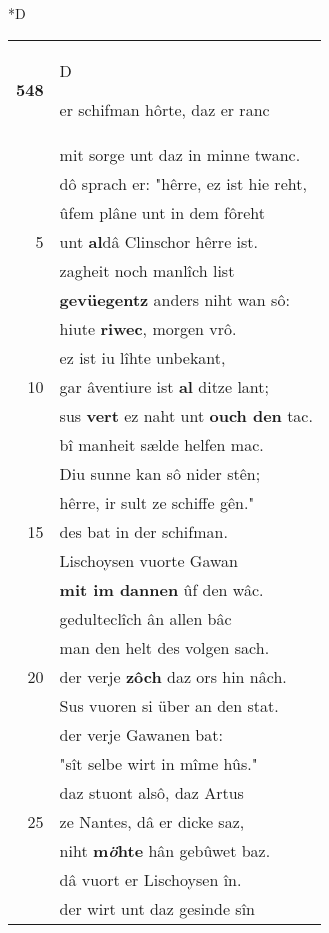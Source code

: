 \documentclass[8pt,a4paper,notitlepage]{article}
\begin{document}
\begin{table}[ht]
\begin{minipage}[t]{0.5\linewidth}
\small
\begin{center}*D
\end{center}
\begin{tabular}{rl}
\textbf{548} & \begin{large}D\end{large}er schifman hôrte, daz er ranc\\ 
 & mit sorge unt daz in minne twanc.\\ 
 & dô sprach er: "hêrre, ez ist hie reht,\\ 
 & ûfem plâne unt in dem fôreht\\ 
5 & unt \textbf{al}dâ Clinschor hêrre ist.\\ 
 & zagheit noch manlîch list\\ 
 & \textbf{gevüegent}\textbf{z} anders niht wan sô:\\ 
 & hiute \textbf{riwec}, morgen vrô.\\ 
 & ez ist iu lîhte unbekant,\\ 
10 & gar âventiure ist \textbf{al} ditze lant;\\ 
 & sus \textbf{vert} ez naht unt \textbf{ouch den} tac.\\ 
 & bî manheit sælde helfen mac.\\ 
 & Diu sunne kan sô nider stên;\\ 
 & hêrre, ir sult ze schiffe gên."\\ 
15 & des bat in der schifman.\\ 
 & Lischoysen vuorte Gawan\\ 
 & \textbf{mit im dannen} ûf den wâc.\\ 
 & gedulteclîch ân allen bâc\\ 
 & man den helt des volgen sach.\\ 
20 & der verje \textbf{zôch} daz ors hin nâch.\\ 
 & Sus vuoren si über an den stat.\\ 
 & der verje Gawanen bat:\\ 
 & "sît selbe wirt in mîme hûs."\\ 
 & daz stuont alsô, daz Artus\\ 
25 & ze Nantes, dâ er dicke saz,\\ 
 & niht \textbf{m\textit{ö}hte} hân gebûwet baz.\\ 
 & dâ vuort er Lischoysen în.\\ 
 & der wirt unt daz gesinde sîn\\ 

\end{tabular}
\end{minipage}
\end{table}
\end{document}
